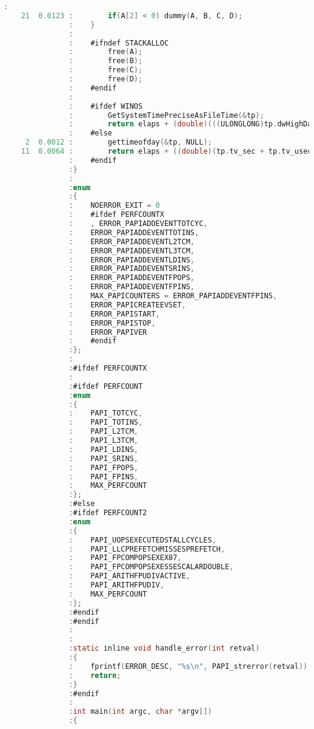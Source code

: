\begin{lstlisting}[language=C,breaklines=true]
               :			
    21  0.0123 :		if(A[2] < 0) dummy(A, B, C, D);
               :	}
               :	
               :	#ifndef STACKALLOC
               :		free(A);
               :		free(B); 
               :		free(C);
               :		free(D);
               :	#endif
               :	
               :	#ifdef WINOS
               :		GetSystemTimePreciseAsFileTime(&tp);
               :		return elaps + (double)(((ULONGLONG)tp.dwHighDateTime << 32) | (ULONGLONG)tp.dwLowDateTime)/10000000.0;
               :	#else
     2  0.0012 :		gettimeofday(&tp, NULL);
    11  0.0064 :		return elaps + ((double)(tp.tv_sec + tp.tv_usec/1000000.0));
               :	#endif
               :}
               :
               :enum
               :{
               :	NOERROR_EXIT = 0
               :	#ifdef PERFCOUNTX
               :	, ERROR_PAPIADDEVENTTOTCYC,
               :	ERROR_PAPIADDEVENTTOTINS,
               :	ERROR_PAPIADDEVENTL2TCM,
               :	ERROR_PAPIADDEVENTL3TCM,
               :	ERROR_PAPIADDEVENTLDINS,
               :	ERROR_PAPIADDEVENTSRINS,
               :	ERROR_PAPIADDEVENTFPOPS,
               :	ERROR_PAPIADDEVENTFPINS,
               :	MAX_PAPICOUNTERS = ERROR_PAPIADDEVENTFPINS,
               :	ERROR_PAPICREATEEVSET,
               :	ERROR_PAPISTART,
               :	ERROR_PAPISTOP,
               :	ERROR_PAPIVER
               :	#endif
               :};
               :
               :#ifdef PERFCOUNTX
               :
               :#ifdef PERFCOUNT
               :enum
               :{
               :	PAPI_TOTCYC,
               :	PAPI_TOTINS,
               :	PAPI_L2TCM,
               :	PAPI_L3TCM,
               :	PAPI_LDINS,
               :	PAPI_SRINS,
               :	PAPI_FPOPS,
               :	PAPI_FPINS,
               :	MAX_PERFCOUNT
               :};
               :#else
               :#ifdef PERFCOUNT2
               :enum
               :{
               :	PAPI_UOPSEXECUTEDSTALLCYCLES,
               :	PAPI_LLCPREFETCHMISSESPREFETCH,
               :	PAPI_FPCOMPOPSEXEX87,
               :	PAPI_FPCOMPOPSEXESSESCALARDOUBLE,
               :	PAPI_ARITHFPUDIVACTIVE,
               :	PAPI_ARITHFPUDIV,
               :	MAX_PERFCOUNT
               :};
               :#endif 
               :#endif
               :	
               :
               :static inline void handle_error(int retval)
               :{
               :	fprintf(ERROR_DESC, "%s\n", PAPI_strerror(retval));
               :	return;
               :}
               :#endif
               :
               :int main(int argc, char *argv[])
               :{

\end{lstlisting}
